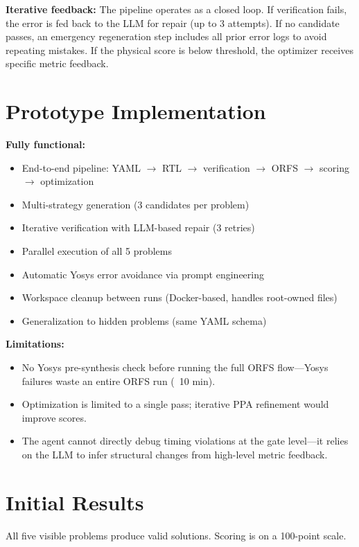 \documentclass[10pt]{article}
\begin{document}
\textbf{Iterative feedback:} The pipeline operates as a closed loop. If verification fails, the error is fed back to the LLM for repair (up to 3 attempts). If no candidate passes, an emergency regeneration step includes all prior error logs to avoid repeating mistakes. If the physical score is below threshold, the optimizer receives specific metric feedback.

\section{Prototype Implementation}

\textbf{Fully functional:}
\begin{itemize}[topsep=2pt,itemsep=0pt]
  \item End-to-end pipeline: YAML $\to$ RTL $\to$ verification $\to$ ORFS $\to$ scoring $\to$ optimization
  \item Multi-strategy generation (3 candidates per problem)
  \item Iterative verification with LLM-based repair (3 retries)
  \item Parallel execution of all 5 problems
  \item Automatic Yosys error avoidance via prompt engineering
  \item Workspace cleanup between runs (Docker-based, handles root-owned files)
  \item Generalization to hidden problems (same YAML schema)
\end{itemize}

\textbf{Limitations:}
\begin{itemize}[topsep=2pt,itemsep=0pt]
  \item No Yosys pre-synthesis check before running the full ORFS flow---Yosys failures waste an entire ORFS run (~10 min).
  \item Optimization is limited to a single pass; iterative PPA refinement would improve scores.
  \item The agent cannot directly debug timing violations at the gate level---it relies on the LLM to infer structural changes from high-level metric feedback.
\end{itemize}

\section{Initial Results}

All five visible problems produce valid solutions. Scoring is on a 100-point scale.
\end{document}
